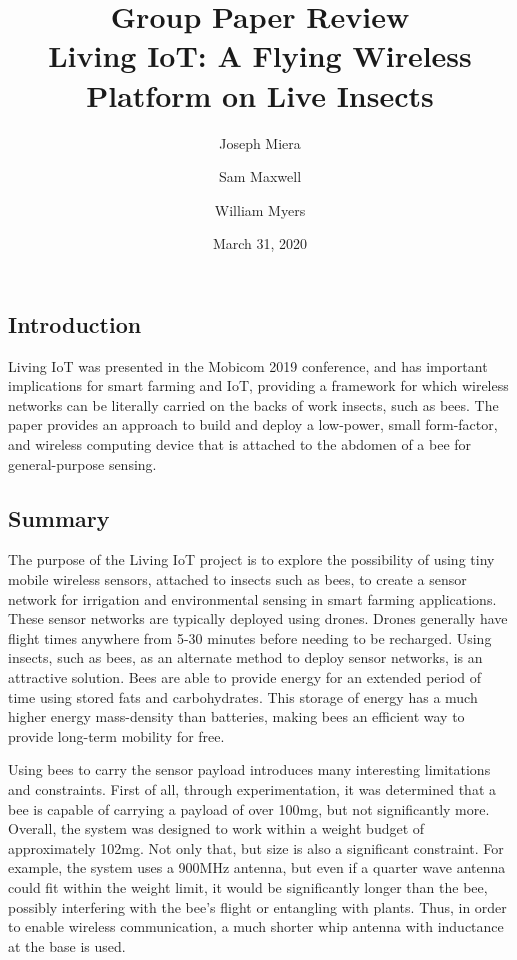 \documentclass[letterpaper,twocolumn,10pt]{article}
\title{Group Paper Review\\
Living IoT: A Flying Wireless Platform on Live Insects}
\author{Joseph Miera}
\author{Sam Maxwell}
\author{William Myers}
\affil{}
\date{March 31, 2020}
\begin{document}
\maketitle


\subsection*{Introduction}

Living IoT was presented in the Mobicom 2019 conference, and has important implications for smart farming and IoT, providing a framework for which wireless networks can be literally carried on the backs of work insects, such as bees. The paper provides an approach to build and deploy a low-power, small form-factor, and wireless computing device that is attached to the abdomen of a bee for general-purpose sensing.

\subsection*{Summary}
 
The purpose of the Living IoT project is to explore the possibility of using tiny mobile wireless sensors, attached to insects such as bees, to create a sensor network for irrigation and environmental sensing in smart farming applications. These sensor networks are typically deployed using drones. Drones generally have flight times anywhere from 5-30 minutes before needing to be recharged. Using insects, such as bees, as an alternate method to deploy sensor networks, is an attractive solution. Bees are able to provide energy for an extended period of time using stored fats and carbohydrates. This storage of energy has a much higher energy mass-density than batteries, making bees an efficient way to provide long-term mobility for free. 
 
Using bees to carry the sensor payload introduces many interesting limitations and constraints. First of all, through experimentation, it was determined that a bee is capable of carrying a payload of over 100mg, but not significantly more. Overall, the system was designed to work within a weight budget of approximately 102mg. Not only that, but size is also a significant constraint. For example, the system uses a 900MHz antenna, but even if a quarter wave antenna could fit within the weight limit, it would be significantly longer than the bee, possibly interfering with the bee's flight or entangling with plants. Thus, in order to enable wireless communication, a much shorter whip antenna with inductance at the base is used. 
\end{document}
